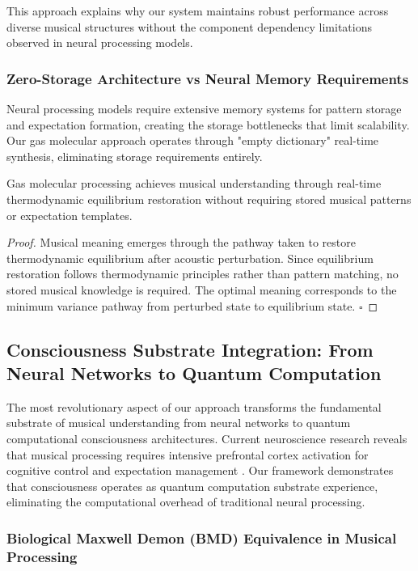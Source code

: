 This approach explains why our system maintains robust performance across diverse musical structures without the component dependency limitations observed in neural processing models.

\subsubsection{Zero-Storage Architecture vs Neural Memory Requirements}

Neural processing models require extensive memory systems for pattern storage and expectation formation, creating the storage bottlenecks that limit scalability. Our gas molecular approach operates through "empty dictionary" real-time synthesis, eliminating storage requirements entirely.

\begin{theorem}
Gas molecular processing achieves musical understanding through real-time thermodynamic equilibrium restoration without requiring stored musical patterns or expectation templates.
\end{theorem}

\begin{proof}
Musical meaning emerges through the pathway taken to restore thermodynamic equilibrium after acoustic perturbation. Since equilibrium restoration follows thermodynamic principles rather than pattern matching, no stored musical knowledge is required. The optimal meaning corresponds to the minimum variance pathway from perturbed state to equilibrium state. $\square$
\end{proof}

\subsection{Consciousness Substrate Integration: From Neural Networks to Quantum Computation}

The most revolutionary aspect of our approach transforms the fundamental substrate of musical understanding from neural networks to quantum computational consciousness architectures. Current neuroscience research reveals that musical processing requires intensive prefrontal cortex activation for cognitive control and expectation management \cite{fukuie2022groove}. Our framework demonstrates that consciousness operates as quantum computation substrate experience, eliminating the computational overhead of traditional neural processing.

\subsubsection{Biological Maxwell Demon (BMD) Equivalence in Musical Processing}

